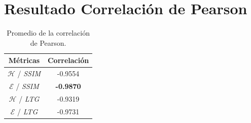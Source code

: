 \begin{figure}[H]
    \begin{center}
    \end{center}
    \label{fig:gral9}
\end{figure}


\section{Resultado Correlación de Pearson}

\begin{table}[H]
\centering
\caption{Promedio de la correlación de Pearson.}
\begin{tabular}{|c|c|}
\hline
Métricas & Correlación \\
\hline \hline 
$\mathscr{H}$ / \textit{SSIM} & -0.9554 \\ \hline
$\mathscr{E}$ / \textit{SSIM} & \textbf{-0.9870}\\ \hline
$\mathscr{H}$ / \textit{LTG} & -0.9319 \\ \hline
$\mathscr{E}$ / \textit{LTG} & -0.9731 \\ \hline
\end{tabular}
\label{tabla:promcorrelacion}
\centering
\end{table}

